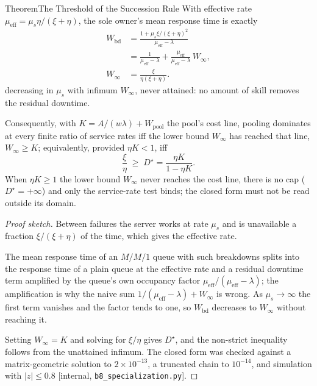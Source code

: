 \documentclass[11pt,a4paper]{article}
\theoremstyle{definition}
\theoremstyle{definition}
\theoremstyle{remark}
\begin{document}
\begin{pdclaim}{Theorem}{The Threshold of the Succession Rule}
\setlength{\parskip}{4pt plus 1pt}
\label{thm:succession-price}
With effective rate $\mu_{\mathrm{eff}}=\mu_s\eta/(\xi+\eta)$, the sole owner's
mean response time is exactly
\[
\begin{aligned}
W_{\mathrm{bd}}&=\frac{1+\mu_s\xi/(\xi+\eta)^2}{\mu_{\mathrm{eff}}-\lambda}\\[3pt]
&=\frac{1}{\mu_{\mathrm{eff}}-\lambda}+\frac{\mu_{\mathrm{eff}}}{\mu_{\mathrm{eff}}-\lambda}\,W_\infty,\\[3pt]
W_\infty&=\frac{\xi}{\eta(\xi+\eta)}.
\end{aligned}
\]
decreasing in $\mu_s$ with infimum $W_\infty$, never attained: no amount of
skill removes the residual downtime.

Consequently, with
$K=A/(w\lambda)+W_{\mathrm{pool}}$ the pool's cost line, pooling dominates at
every finite ratio of service rates iff the lower bound $W_\infty$ has reached that line,
$W_\infty\ge K$; equivalently, provided $\eta K<1$, iff
\[
\frac{\xi}{\eta}\;\ge\;D^\star=\frac{\eta K}{1-\eta K}.
\]
When $\eta K\ge1$ the lower bound $W_\infty$ never reaches the cost line, there is no cap
($D^\star=+\infty$) and only the service-rate test binds; the closed form must not
be read outside its domain.
\end{pdclaim}
\begin{proof}[Proof sketch]
\setlength{\parskip}{4pt plus 1pt}
Between failures the server works at rate $\mu_s$ and is unavailable a fraction
$\xi/(\xi+\eta)$ of the time, which gives the effective rate.

The mean response
time of an $M/M/1$ queue with such breakdowns splits into the response time of a
plain queue at the effective rate and a residual downtime term amplified by the
queue's own occupancy factor $\mu_{\mathrm{eff}}/(\mu_{\mathrm{eff}}-\lambda)$;
the amplification is why the naive sum
$1/(\mu_{\mathrm{eff}}-\lambda)+W_\infty$ is wrong. As $\mu_s\to\infty$ the
first term vanishes and the factor tends to one, so $W_{\mathrm{bd}}$ decreases
to $W_\infty$ without reaching it.

Setting $W_\infty=K$ and solving for
$\xi/\eta$ gives $D^\star$, and the non-strict inequality follows from the
unattained infimum. The closed form was checked against a matrix-geometric
solution to $2\times10^{-13}$, a truncated chain to $10^{-14}$, and simulation
with $|z|\le0.8$ [internal, \texttt{b8\_specialization.py}].
\end{proof}
\end{document}
